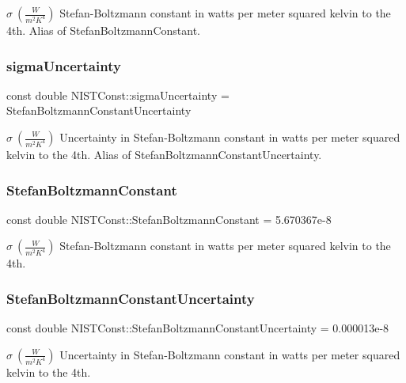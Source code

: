 $\sigma \ (\frac{W}{m^2 K^4})$ Stefan-\/\+Boltzmann constant in watts per meter squared kelvin to the 4th. Alias of Stefan\+Boltzmann\+Constant. \mbox{\label{group___stefan_boltzmann_constant_ga0b88b9501b1c17b97f06de9ab7ba71f2}} 
\subsubsection{\texorpdfstring{sigma\+Uncertainty}{sigmaUncertainty}}
{\footnotesize\ttfamily const double N\+I\+S\+T\+Const\+::sigma\+Uncertainty = Stefan\+Boltzmann\+Constant\+Uncertainty}

$\sigma \ (\frac{W}{m^2 K^4})$ Uncertainty in Stefan-\/\+Boltzmann constant in watts per meter squared kelvin to the 4th. Alias of Stefan\+Boltzmann\+Constant\+Uncertainty. \mbox{\label{group___stefan_boltzmann_constant_ga1094e420290686333202d186399d706d}} 
\subsubsection{\texorpdfstring{Stefan\+Boltzmann\+Constant}{StefanBoltzmannConstant}}
{\footnotesize\ttfamily const double N\+I\+S\+T\+Const\+::\+Stefan\+Boltzmann\+Constant = 5.\+670367e-\/8}

$\sigma \ (\frac{W}{m^2 K^4})$ Stefan-\/\+Boltzmann constant in watts per meter squared kelvin to the 4th. \mbox{\label{group___stefan_boltzmann_constant_ga98b40b4f7ea1cd358d0a140bf8f6973c}} 
\subsubsection{\texorpdfstring{Stefan\+Boltzmann\+Constant\+Uncertainty}{StefanBoltzmannConstantUncertainty}}
{\footnotesize\ttfamily const double N\+I\+S\+T\+Const\+::\+Stefan\+Boltzmann\+Constant\+Uncertainty = 0.\+000013e-\/8}

$\sigma \ (\frac{W}{m^2 K^4})$ Uncertainty in Stefan-\/\+Boltzmann constant in watts per meter squared kelvin to the 4th. 